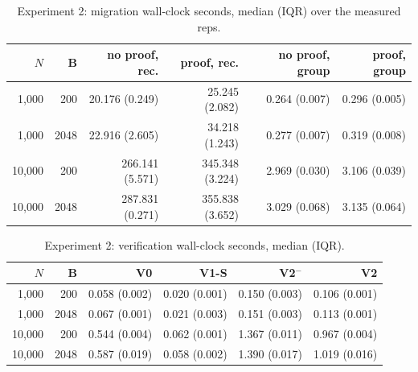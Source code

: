 \begin{table}[t]
  \centering
  \caption{Experiment 2: migration wall-clock seconds, median (IQR) over the measured reps.}
  \label{tab:e2time}
  \begin{tabular}{rrrrrr}
    \toprule
    $N$ & B & no proof, rec. & proof, rec. & no proof, group & proof, group \\
    \midrule
    1{,}000 & 200 & 20.176 (0.249) & 25.245 (2.082) & 0.264 (0.007) & 0.296 (0.005) \\
    1{,}000 & 2048 & 22.916 (2.605) & 34.218 (1.243) & 0.277 (0.007) & 0.319 (0.008) \\
    10{,}000 & 200 & 266.141 (5.571) & 345.348 (3.224) & 2.969 (0.030) & 3.106 (0.039) \\
    10{,}000 & 2048 & 287.831 (0.271) & 355.838 (3.652) & 3.029 (0.068) & 3.135 (0.064) \\
    \bottomrule
  \end{tabular}
\end{table}

\begin{table}[t]
  \centering
  \caption{Experiment 2: verification wall-clock seconds, median (IQR).}
  \label{tab:e2verify}
  \begin{tabular}{rrrrrr}
    \toprule
    $N$ & B & V0 & V1-S & V2$^{-}$ & V2 \\
    \midrule
    1{,}000 & 200 & 0.058 (0.002) & 0.020 (0.001) & 0.150 (0.003) & 0.106 (0.001) \\
    1{,}000 & 2048 & 0.067 (0.001) & 0.021 (0.003) & 0.151 (0.003) & 0.113 (0.001) \\
    10{,}000 & 200 & 0.544 (0.004) & 0.062 (0.001) & 1.367 (0.011) & 0.967 (0.004) \\
    10{,}000 & 2048 & 0.587 (0.019) & 0.058 (0.002) & 1.390 (0.017) & 1.019 (0.016) \\
    \bottomrule
  \end{tabular}
\end{table}
